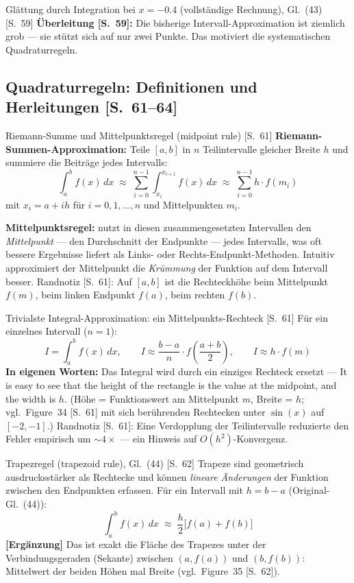 \begin{bspbox}{Glättung durch Integration bei $x = -0.4$ (vollständige Rechnung), Gl.~(43) [S.~59]}
\medskip
\textbf{Überleitung [S.~59]:} Die bisherige Intervall-Approximation ist ziemlich grob
--- sie stützt sich auf nur zwei Punkte. Das motiviert die systematischen
Quadraturregeln.
\end{bspbox}

\subsection{Quadraturregeln: Definitionen und Herleitungen [S.~61--64]}

\begin{defbox}{Riemann-Summe und Mittelpunktsregel (midpoint rule) [S.~61]}
\textbf{Riemann-Summen-Approximation:} Teile $[a,b]$ in $n$ Teilintervalle gleicher
Breite $h$ und summiere die Beiträge jedes Intervalls:
\[
  \int_a^b f(x)\,dx \;\approx\; \sum_{i=0}^{n-1} \int_{x_i}^{x_{i+1}} f(x)\,dx
  \;\approx\; \sum_{i=0}^{n-1} h \cdot f(m_i)
\]
mit $x_i = a + ih$ für $i = 0, 1, \ldots, n$ und Mittelpunkten $m_i$.

\medskip
\textbf{Mittelpunktsregel:} nutzt in diesen zusammengesetzten Intervallen den
\emph{Mittelpunkt} --- den Durchschnitt der Endpunkte --- jedes Intervalls, was oft
bessere Ergebnisse liefert als Links- oder Rechts-Endpunkt-Methoden. Intuitiv
approximiert der Mittelpunkt die \emph{Krümmung} der Funktion auf dem Intervall
besser. Randnotiz [S.~61]: Auf $[a,b]$ ist die Rechteckhöhe beim Mittelpunkt $f(m)$,
beim linken Endpunkt $f(a)$, beim rechten $f(b)$.
\end{defbox}

\begin{satzbox}{Trivialste Integral-Approximation: ein Mittelpunkts-Rechteck [S.~61]}
Für ein einzelnes Intervall ($n = 1$):
\[
  I = \int_a^b f(x)\,dx, \qquad
  I \approx \frac{b-a}{n} \cdot f\!\left(\frac{a+b}{2}\right), \qquad
  I \approx h \cdot f(m)
\]
\textbf{In eigenen Worten:} Das Integral wird durch ein einziges Rechteck ersetzt ---
\glqq It is easy to see that the height of the rectangle is the value at the midpoint,
and the width is $h$.\grqq{} (Höhe = Funktionswert am Mittelpunkt $m$, Breite = $h$;
vgl.\ Figure~34 [S.~61] mit sich berührenden Rechtecken unter $\sin(x)$ auf
$[-2,-1]$.) Randnotiz [S.~61]: Eine Verdopplung der Teilintervalle reduzierte den
Fehler empirisch um $\sim 4\times$ --- ein Hinweis auf $O(h^2)$-Konvergenz.
\end{satzbox}

\begin{defbox}{Trapezregel (trapezoid rule), Gl.~(44) [S.~62]}
Trapeze sind geometrisch ausdrucksstärker als Rechtecke und können \emph{lineare
Änderungen} der Funktion zwischen den Endpunkten erfassen. Für ein Intervall mit
$h = b - a$ (Original-Gl.~(44)):
\[
  \int_a^b f(x)\,dx \;\approx\; \frac{h}{2}\bigl[f(a) + f(b)\bigr] \tag{44}
\]
\textbf{[Ergänzung]} Das ist exakt die Fläche des Trapezes unter der
Verbindungsgeraden (Sekante) zwischen $(a, f(a))$ und $(b, f(b))$: Mittelwert der
beiden Höhen mal Breite (vgl.\ Figure~35 [S.~62]).
\end{defbox}

